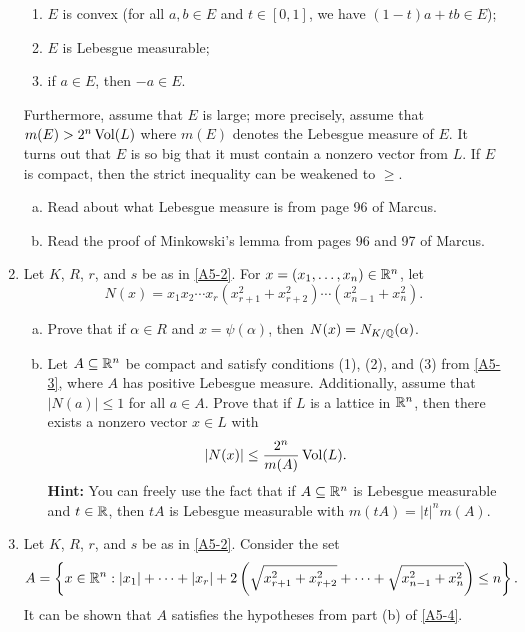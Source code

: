 \begin{enumerate}[leftmargin=1.5cm, label={{\bf A5-\arabic*}}]
\begin{enumerate}[(1)]
        \item $E$ is convex (for all $a, b \in E$ and $t \in [0, 1]$, we have 
        $(1-t)a + tb \in E$); 
        \item $E$ is Lebesgue measurable; 
        \item if $a \in E$, then $-a \in E$.
    \end{enumerate}
    Furthermore, assume that $E$ is large; more precisely, assume that 
    $m(E) > 2^n \operatorname{Vol}(L)$ where $m(E)$ denotes the Lebesgue measure of $E$. 
    It turns out that $E$ is so big that it must contain a nonzero vector from $L$.
    If $E$ is compact, then the strict inequality can be weakened to $\geq$.
    \begin{enumerate}[(a)]
        \item Read about what Lebesgue measure is from page 96 of Marcus. 
        \item Read the proof of Minkowski's lemma from pages 96 and 97 of Marcus.
    \end{enumerate}
    \item \label{A5-4} Let $K$, $R$, $r$, and $s$ be as in \ref{A5-2}. 
    For $x = (x_1, \dots, x_n) \in \mathbb{R}^n$, let 
    \[ N(x) = x_1 x_2 \cdots x_r (x_{r+1}^2 + x_{r+2}^2) \cdots (x_{n-1}^2 + x_n^2). \] 
    \begin{enumerate}[(a)]
        \item Prove that if $\alpha \in R$ and $x = \psi(\alpha)$, then 
        $N(x) = N_{K/\mathbb{Q}}(\alpha)$. 
        \item Let $A \subseteq \mathbb{R}^n$ be compact and satisfy conditions (1), 
        (2), and (3) from \ref{A5-3}, where $A$ has positive Lebesgue measure. 
        Additionally, assume that $|N(a)| \leq 1$ for all $a \in A$. Prove that 
        if $L$ is a lattice in $\mathbb{R}^n$, then there exists a nonzero vector $x \in L$ 
        with 
        \[ |N(x)| \leq \frac{2^n}{m(A)} \operatorname{Vol}(L). \] 
        {\bf Hint:} You can freely use the fact that if $A \subseteq \mathbb{R}^n$ is 
        Lebesgue measurable and $t \in \mathbb{R}$, then $tA$ is Lebesgue measurable 
        with $m(tA) = |t|^n m(A)$.
    \end{enumerate}
    \item \label{A5-5} Let $K$, $R$, $r$, and $s$ be as in \ref{A5-2}. 
    Consider the set 
    \[ A = \left\{ x \in \mathbb{R}^n : |x_1| + \cdots + |x_r| + 2 
    \left( \sqrt{ x_{r+1}^2 + x_{r+2}^2 } + \cdots + \sqrt{ x_{n-1}^2 + x_n^2 } 
    \right) \leq n \right\}. \] 
    It can be shown that $A$ satisfies the hypotheses from part (b) of \ref{A5-4}.
    \begin{enumerate}[(a)]

\end{enumerate}
\end{enumerate}
